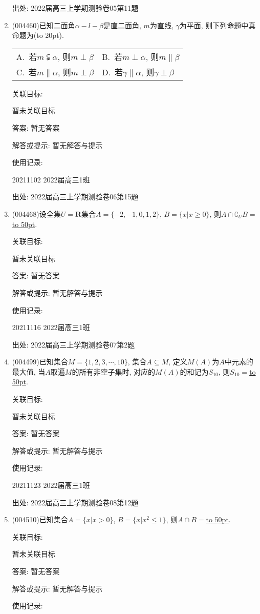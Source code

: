 \documentclass[10pt,a4paper]{article}
\newcommand{\blank}[1]{\underline{\hbox to #1pt{}}}
\newcommand{\bracket}[1]{(\hbox to #1pt{})}
\newcommand{\twoch}[4]{\par\begin{tabular}{p{.46\textwidth}p{.46\textwidth}}
A.~#1& B.~#2\\
C.~#3& D.~#4
\end{tabular}}
\begin{document}
\begin{enumerate}[1.]
出处: 2022届高三上学期测验卷05第11题
\item { (004460)}已知二面角$\alpha-l-\beta$是直二面角, $m$为直线, $\gamma$为平面, 则下列命题中真命题为\bracket{20}.
\twoch{若$m\subsetneqq \alpha$, 则$m\perp \beta$}{若$m\perp \alpha$, 则$m\parallel \beta$}{若$m\parallel \alpha$, 则$m\perp \beta$}{若$\gamma\parallel \alpha$, 则$\gamma\perp \beta$}


关联目标:

暂未关联目标

答案: 暂无答案

解答或提示: 暂无解答与提示

使用记录:

20211102	2022届高三1班	


出处: 2022届高三上学期测验卷06第15题
\item { (004468)}设全集$U=\mathbf{R}$集合$A=\{-2,-1,0,1,2\}$, $B=\{x|x\ge 0\}$, 则$A\cap \complement_UB=$\blank{50}.


关联目标:

暂未关联目标

答案: 暂无答案

解答或提示: 暂无解答与提示

使用记录:

20211116	2022届高三1班	


出处: 2022届高三上学期测验卷07第2题
\item { (004499)}已知集合$M=\{1,2,3,\cdots,10\}$, 集合$A\subseteq M$, 定义$M(A)$为$A$中元素的最大值, 当$A$取遍$M$的所有非空子集时, 对应的$M(A)$的和记为$S_{10}$, 则$S_{10}=$\blank{50}.


关联目标:

暂未关联目标

答案: 暂无答案

解答或提示: 暂无解答与提示

使用记录:

20211123	2022届高三1班	


出处: 2022届高三上学期测验卷08第12题
\item { (004510)}已知集合$A=\{x|x>0\}$, $B=\{x|x^2\le 1\}$, 则$A\cap B=$\blank{50}.


关联目标:

暂未关联目标

答案: 暂无答案

解答或提示: 暂无解答与提示

使用记录:


\end{enumerate}
\end{document}

